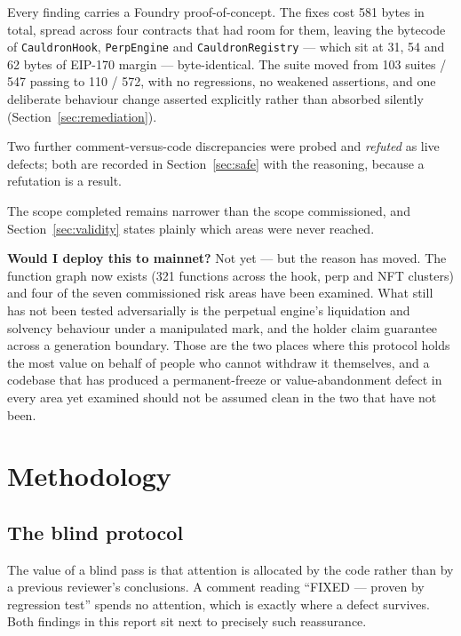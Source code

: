 \documentclass[11pt,a4paper]{article}
\newcommand{\code}[1]{\texttt{\small #1}}
\begin{document}
Every finding carries a Foundry proof-of-concept. The fixes cost 581 bytes in total,
spread across four contracts that had room for them, leaving the bytecode of
\code{CauldronHook}, \code{PerpEngine} and \code{CauldronRegistry} --- which sit at 31, 54
and 62 bytes of EIP-170 margin --- byte-identical. The suite moved from 103 suites / 547
passing to 110 / 572, with no regressions, no weakened assertions, and one deliberate
behaviour change asserted explicitly rather than absorbed silently
(Section~\ref{sec:remediation}).

Two further comment-versus-code discrepancies were probed and \emph{refuted} as live
defects; both are recorded in Section~\ref{sec:safe} with the reasoning, because a
refutation is a result.

The scope completed remains narrower than the scope commissioned, and
Section~\ref{sec:validity} states plainly which areas were never reached.

\textbf{Would I deploy this to mainnet?} Not yet --- but the reason has moved. The
function graph now exists (321 functions across the hook, perp and NFT clusters) and four
of the seven commissioned risk areas have been examined. What still has not been tested
adversarially is the perpetual engine's liquidation and solvency behaviour under a
manipulated mark, and the holder claim guarantee across a generation boundary. Those are
the two places where this protocol holds the most value on behalf of people who cannot
withdraw it themselves, and a codebase that has produced a permanent-freeze or
value-abandonment defect in every area yet examined should not be assumed clean in the
two that have not been.

\section{Methodology}

\subsection{The blind protocol}

The value of a blind pass is that attention is allocated by the code rather than by a
previous reviewer's conclusions. A comment reading ``FIXED --- proven by regression test''
spends no attention, which is exactly where a defect survives. Both findings in this
report sit next to precisely such reassurance.
\end{document}
